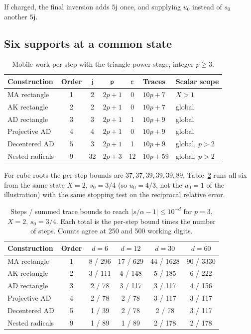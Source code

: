 If charged, the final inversion adds $5\mathsf{j}$ once, and supplying $u_0$ instead of $s_0$ another $5\mathsf{j}$.

\subsection{Six supports at a common state}

\begin{table}[h]
\centering\small
\caption{Mobile work per step with the triangle power stage, integer $p\ge3$.}\label{tab:mobile}
\begin{tabular}{@{}lccccll@{}}
\toprule
Construction & Order & $\mathsf{j}$ & $\mathsf{p}$ & $\mathsf{c}$ & Traces & Scalar scope\\
\midrule
MA rectangle & 1 & 2 & $2p+1$ & 0 & $10p+7$ & $X>1$\\
AK rectangle & 2 & 2 & $2p+1$ & 0 & $10p+7$ & global\\
AD rectangle & 3 & 3 & $2p+1$ & 1 & $10p+9$ & global\\
Projective AD & 4 & 4 & $2p+1$ & 0 & $10p+9$ & global\\
Decentered AD & 5 & 3 & $2p+1$ & 1 & $10p+9$ & global, $p>2$\\
Nested radicals & 9 & 32 & $2p+3$ & 12 & $10p+59$ & global, $p>2$\\
\bottomrule
\end{tabular}
\end{table}

For cube roots the per-step bounds are $37,37,39,39,39,89$. Table~\ref{tab:cubic} runs all six from the
same state $X=2$, $s_0=3/4$ (so $u_0=4/3$, not the $u_0=1$ of the illustration) with the same stopping
test on the reciprocal relative error.

\begin{table}[h]
\centering\small
\caption{Steps / summed trace bounds to reach $|s/\alpha-1|\le10^{-d}$ for $p=3$, $X=2$, $s_0=3/4$.
Each total is the per-step bound times the number of steps. Counts agree at 250 and 500 working
digits.}\label{tab:cubic}
\begin{tabular}{@{}lccccc@{}}
\toprule
Construction & Order & $d=6$ & $d=12$ & $d=30$ & $d=60$\\
\midrule
MA rectangle & 1 & 8 / 296 & 17 / 629 & 44 / 1628 & 90 / 3330\\
AK rectangle & 2 & 3 / 111 & 4 / 148 & 5 / 185 & 6 / 222\\
AD rectangle & 3 & 2 / 78 & 3 / 117 & 3 / 117 & 4 / 156\\
Projective AD & 4 & 2 / 78 & 2 / 78 & 3 / 117 & 3 / 117\\
Decentered AD & 5 & 1 / 39 & 2 / 78 & 2 / 78 & 3 / 117\\
Nested radicals & 9 & 1 / 89 & 1 / 89 & 2 / 178 & 2 / 178\\
\bottomrule
\end{tabular}
\end{table}

